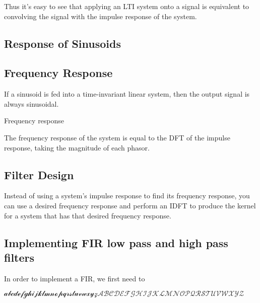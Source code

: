 \begin{center}\end{center}

Thus it's easy to see that applying an LTI system onto a signal is equivalent to 
convolving the signal with the impulse response of the system.

\subsection{Response of Sinusoids}


\subsection{Frequency Response}
If a sinusoid is fed into a time-invariant linear system, then the output signal is always sinusoidal.

Frequency response

The frequency response of the system is equal to the DFT of the impulse response,
taking the magnitude of each phasor.

\subsection{Filter Design}
Instead of using a system's impulse response to find its frequency response, 
you can use a desired frequency response and perform an IDFT to produce the 
kernel for a system that has that desired frequency response.



\subsection{Implementing FIR low pass and high pass filters}
In order to implement a FIR, we first need to
\pagebreak

$\mathcal{abcdefghijklmnopqrstuvwxyzABCDEFGHIJKLMNOPQRSTUVWXYZ}$